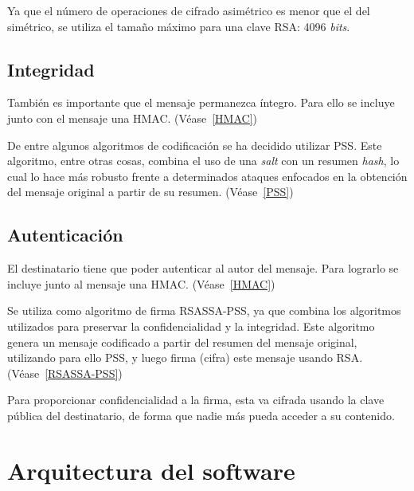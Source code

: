 Ya que el número de operaciones de cifrado asimétrico es menor que el del simétrico, se utiliza el tamaño máximo para una clave RSA: 4096 \emph{bits}.

\subsection{Integridad}

También es importante que el mensaje permanezca íntegro. Para ello se incluye junto con el mensaje una HMAC. (Véase~\ref{HMAC})

De entre algunos algoritmos de codificación se ha decidido utilizar PSS. Este algoritmo, entre otras cosas, combina el uso de una \emph{salt} con un resumen \emph{hash}, lo cual lo hace más robusto frente a determinados ataques enfocados en la obtención del mensaje original a partir de su resumen. (Véase~\ref{PSS})

\subsection{Autenticación}

El destinatario tiene que poder autenticar al autor del mensaje. Para lograrlo se incluye junto al mensaje una HMAC. (Véase~\ref{HMAC})

Se utiliza como algoritmo de firma RSASSA-PSS, ya que combina los algoritmos utilizados para preservar la confidencialidad y la integridad. Este algoritmo genera un mensaje codificado a partir del resumen del mensaje original, utilizando para ello PSS, y luego firma (cifra) este mensaje usando RSA. (Véase~\ref{RSASSA-PSS})

Para proporcionar confidencialidad a la firma, esta va cifrada usando la clave pública del destinatario, de forma que nadie más pueda acceder a su contenido.


\section{Arquitectura del software}

\label{Chapter4.2}

